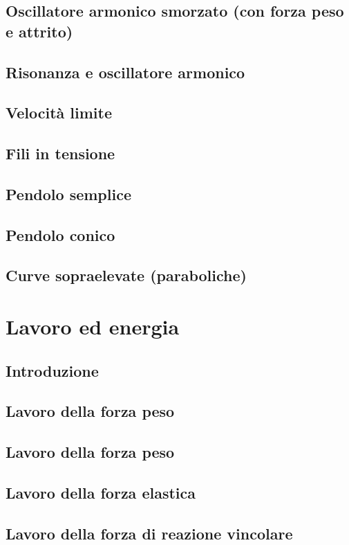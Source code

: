 \documentclass[a4paper]{article}
\begin{document}
\subsection{Oscillatore armonico smorzato (con forza peso e attrito)}
\subsection{Risonanza e oscillatore armonico}
\subsection{Velocità limite}
\subsection{Fili in tensione}
\subsection{Pendolo semplice}
\subsection{Pendolo conico}
\subsection{Curve sopraelevate (paraboliche)}

\section{Lavoro ed energia}
\subsection{Introduzione}
\subsection{Lavoro della forza peso}
\subsection{Lavoro della forza peso}
\subsection{Lavoro della forza elastica}
\subsection{Lavoro della forza di reazione vincolare}
\end{document}
